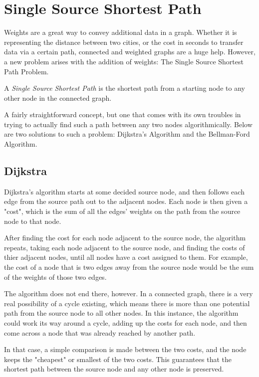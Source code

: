 \chapter{Single Source Shortest Path}

Weights are a great way to convey additional data in a graph. Whether it is representing the distance between two cities, or the cost in seconds to transfer data via a certain path, connected and weighted graphs are a huge help.
However, a new problem arises with the addition of weights: The Single Source Shortest Path Problem.

\begin{definition}
A \emph{Single Source Shortest Path} is the shortest path from a starting node to any other node in the connected graph.
\end{definition}

A fairly straightforward concept, but one that comes with its own troubles in trying to actually find such a path between any two nodes algorithmically. Below are two solutions to such a problem: Dijkstra's Algorithm and the Bellman-Ford Algorithm.

\section{Dijkstra}
Dijkstra's algorithm starts at some decided source node, and then follows each edge from the source path out to the adjacent nodes. Each node is then given a "cost", which is the sum of all the edges' weights on the path from the source node to that node. 

After finding the cost for each node adjacent to the source node, the algorithm repeats, taking each node adjacent to the source node, and finding the costs of thier adjacent nodes, until all nodes have a cost assigned to them. For example, the cost of a node that is two edges away from the source node would be the sum of the weights of those two edges.

The algorithm does not end there, however. In a connected graph, there is a very real possibility of a cycle existing, which means there is more than one potential path from the source node to all other nodes. In this instance, the algorithm could work its way around a cycle, adding up the costs for each node, and then come across a node that was already reached by another path. 

In that case, a simple comparison is made between the two costs, and the node keeps the "cheapest" or smallest of the two costs. This guarantees that the shortest path between the source node and any other node is preserved.

